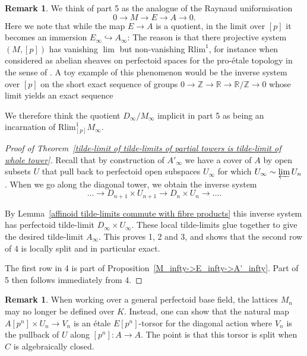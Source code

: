 \documentclass[10pt,oneside]{amsart}
\theoremstyle{definition}
\newtheorem{remark}[theorem]{Remark}
\begin{document}
	\begin{remark}
		
	We think of part 5 as the analogue of the Raynaud uniformisation
		\[0\to M\to E\to A\to 0.\]
	Here we note that while the map $E\to A$ is a quotient, in the limit over $[p]$ it becomes an immersion $E_\infty\hookrightarrow A_\infty$: The reason is that there projective system $(M,[p])$ has vanishing $\lim$ but non-vanishing $\mathrm{Rlim}^1$, for instance when considered as abelian sheaves on perfectoid spaces for the pro-\'etale topology in the sense of \cite{etale_cohomology_of_diamonds}. A toy example of this phenomenon would be the inverse system over $[p]$ on the short exact sequence of groups 
	$0 \to\mathbb Z \to\mathbb R \to \mathbb R/\mathbb Z \to 0$
	whose limit yields an exact sequence
	\begin{center}
	\end{center}
	We therefore think the quotient $D_\infty/M_\infty$ implicit in part 5 as being an incarnation of $\mathrm{Rlim}^1_{[p]}M_\infty$.
\end{remark}
	\begin{proof}[Proof of Theorem~\ref{tilde-limit of tilde-limits of partial towers is tilde-limit of whole tower}]
	Recall that by construction of $A'_\infty$ we have a cover of $A$ by open subsets $U$ that pull back to perfectoid open subspaces $U_\infty$ for which $U_\infty\sim \varprojlim U_n$. When we go along the diagonal tower, we obtain the inverse system 
	 \[\dots\rightarrow D_{n+1}\times U_{n+1}\rightarrow D_{n}\times U_n\rightarrow \dots.\]
	 
	By Lemma~\ref{affinoid tilde-limits commute with fibre products} this inverse system has perfectoid tilde-limit $D_\infty \times U_\infty$. These local tilde-limits glue together to give the desired tilde-limit $A_\infty$. This proves 1, 2 and 3, and shows that the second row of 4 is locally split and in particular exact.
	
	The first row in 4 is part of Proposition~\ref{M_infty->E_infty->A'_infty}. Part of 5 then follows immediately from 4.
	\end{proof}
	\begin{remark}
		When working over a general perfectoid base field, the lattices $M_n$ may no longer be defined over $K$. Instead, one can show that the natural map $A[p^n]\times U_n\to V_n$ is an \'etale $E[p^n]$-torsor for the diagonal action where $V_n$ is the pullback of $U$ along $[p^n]:A\to A$. The point is that this torsor is split when $C$ is algebraically closed.
	\end{remark}
\end{document}
